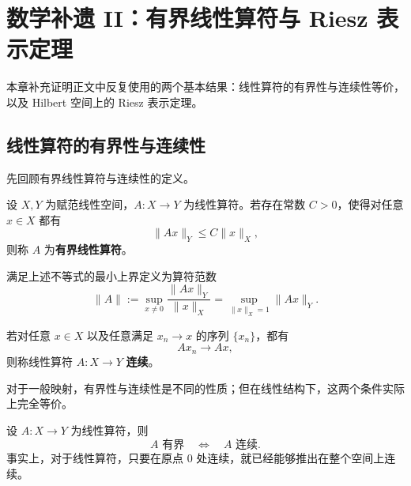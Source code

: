 \documentclass[UTF8,a4paper,11pt,openany]{ctexbook}
\begin{document}
\newpage
\chapter{数学补遗 II：有界线性算符与 Riesz 表示定理}

本章补充证明正文中反复使用的两个基本结果：线性算符的有界性与连续性等价，以及 Hilbert 空间上的 Riesz 表示定理。

\section{线性算符的有界性与连续性}

先回顾有界线性算符与连续性的定义。

\begin{definition}[有界线性算符]
设 $X,Y$ 为赋范线性空间，$A:X\to Y$ 为线性算符。若存在常数 $C>0$，使得对任意 $x\in X$ 都有
\begin{equation}
    \|Ax\|_Y\leq C\|x\|_X,
\end{equation}
则称 $A$ 为\textbf{有界线性算符}。
\end{definition}

满足上述不等式的最小上界定义为算符范数
\begin{equation}
    \|A\|
    :=
    \sup_{x\neq0}
    \frac{\|Ax\|_Y}{\|x\|_X}
    =
    \sup_{\|x\|_X=1}\|Ax\|_Y.
\end{equation}

\begin{definition}[线性算符的连续性]
若对任意 $x\in X$ 以及任意满足 $x_n\to x$ 的序列 $\{x_n\}$，都有
\[
Ax_n\to Ax,
\]
则称线性算符 $A:X\to Y$ \textbf{连续}。
\end{definition}

对于一般映射，有界性与连续性是不同的性质；但在线性结构下，这两个条件实际上完全等价。

\begin{proposition}[有界性与连续性的等价]
设 $A:X\to Y$ 为线性算符，则
\begin{equation}
    A\text{ 有界}
    \quad\Longleftrightarrow\quad
    A\text{ 连续}.
\end{equation}
事实上，对于线性算符，只要在原点 $0$ 处连续，就已经能够推出在整个空间上连续。
\end{proposition}
\end{document}
